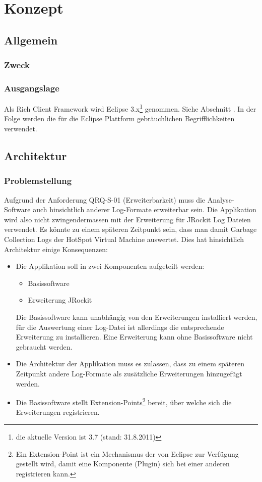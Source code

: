 \chapter{Konzept}
\section{Allgemein}
\subsection{Zweck}

\subsection{Ausgangslage}
Als Rich Client Framework wird Eclipse 3.x\footnote{die aktuelle Version ist 3.7 (stand: 31.8.2011)} genommen. Siehe Abschnitt . In der Folge werden die für die Eclipse Plattform gebräuchlichen Begrifflichkeiten verwendet. 


\section{Architektur}
\subsection{Problemstellung}\label{konzept_uebersicht}
Aufgrund der Anforderung QRQ-S-01 (Erweiterbarkeit) muss die Analyse-Software auch hinsichtlich anderer Log-Formate erweiterbar sein. Die Applikation wird also nicht zwingendermassen mit der Erweiterung für JRockit Log Dateien verwendet. Es könnte zu einem späteren Zeitpunkt sein, dass man damit Garbage Collection Logs der HotSpot Virtual Machine auswertet. Dies hat hinsichtlich Architektur einige Konsequenzen:
\begin{itemize}
	\item Die Applikation soll in zwei Komponenten aufgeteilt werden:
		\begin{itemize}
			\item Basissoftware
			\item Erweiterung JRockit
		\end{itemize}
		Die Basissoftware kann unabhängig von den Erweiterungen installiert werden, für die Auswertung einer Log-Datei ist allerdings die entsprechende Erweiterung zu installieren. Eine Erweiterung kann ohne Basissoftware nicht gebraucht werden.
	\item Die Architektur der Applikation muss es zulassen, dass zu einem späteren Zeitpunkt andere Log-Formate als zusätzliche Erweiterungen hinzugefügt werden.
	\item Die Basissoftware stellt Extension-Points\footnote{Ein Extension-Point ist ein Mechanismus der von Eclipse zur Verfügung gestellt wird, damit eine Komponente (Plugin) sich bei einer anderen registrieren kann.} bereit, über welche sich die Erweiterungen  registrieren.
\end{itemize}

